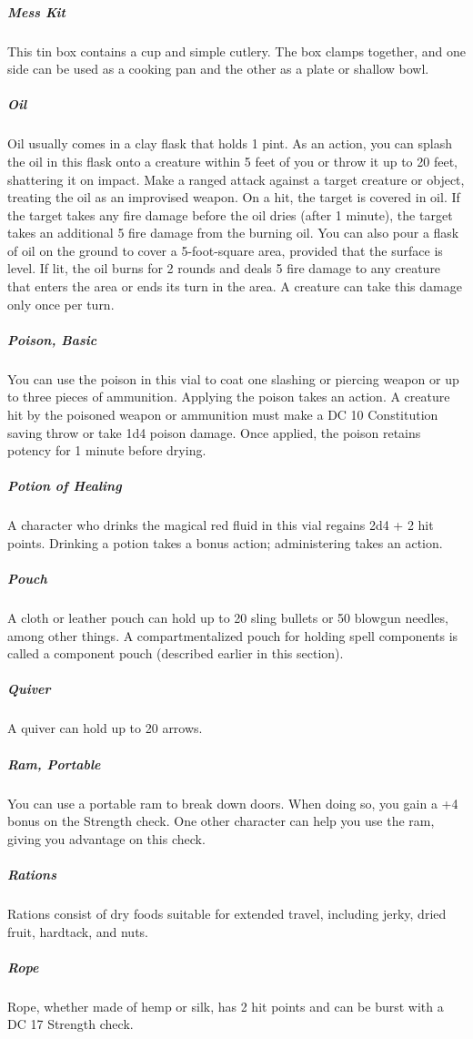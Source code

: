 \subparagraph*{Mess Kit} This tin box contains a cup and simple cutlery. The box clamps together, and one side can be used as a cooking pan and the other as a plate or shallow bowl.

\subparagraph*{Oil} Oil usually comes in a clay flask that holds 1 pint. As an action, you can splash the oil in this flask onto a creature within 5 feet of you or throw it up to 20 feet, shattering it on impact. Make a ranged attack against a target creature or object, treating the oil as an improvised weapon. On a hit, the target is covered in oil. If the target takes any fire damage before the oil dries (after 1 minute), the target takes an additional 5 fire damage from the burning oil. You can also pour a flask of oil on the ground to cover a 5-foot-square area, provided that the surface is level. If lit, the oil burns for 2 rounds and deals 5 fire damage to any creature that enters the area or ends its turn in the area. A creature can take this damage only once per turn.

\subparagraph*{Poison, Basic} You can use the poison in this vial to coat one slashing or piercing weapon or up to three pieces of ammunition. Applying the poison takes an action. A creature hit by the poisoned weapon or ammunition must make a DC 10 Constitution saving throw or take 1d4 poison damage. Once applied, the poison retains potency for 1 minute before drying.

\subparagraph*{Potion of Healing} A character who drinks the magical red fluid in this vial regains 2d4 + 2 hit points. Drinking a potion takes a bonus action; administering takes an action.

\subparagraph*{Pouch} A cloth or leather pouch can hold up to 20 sling bullets or 50 blowgun needles, among other things. A compartmentalized pouch for holding spell components is called a component pouch (described earlier in this section). 

\subparagraph*{Quiver} A quiver can hold up to 20 arrows.

\subparagraph*{Ram, Portable} You can use a portable ram to break down doors. When doing so, you gain a +4 bonus on the Strength check. One other character can help you use the ram, giving you advantage on this check.

\subparagraph*{Rations} Rations consist of dry foods suitable for extended travel, including jerky, dried fruit, hardtack, and nuts.

\subparagraph*{Rope} Rope, whether made of hemp or silk, has 2 hit points and can be burst with a DC 17 Strength check.

